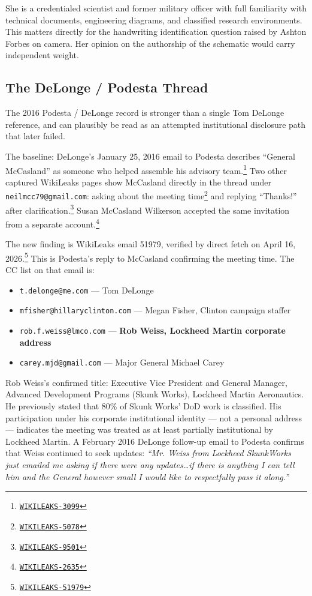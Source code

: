 \documentclass[11pt]{article}
\newcommand{\src}[2]{\href{#1}{\texttt{#2}}}
\begin{document}
She is a credentialed scientist and former military officer with full familiarity with technical documents, engineering diagrams, and classified research environments. This matters directly for the handwriting identification question raised by Ashton Forbes on camera. Her opinion on the authorship of the schematic would carry independent weight.

\subsection{The DeLonge / Podesta Thread}

The 2016 Podesta / DeLonge record is stronger than a single Tom DeLonge reference, and can plausibly be read as an attempted institutional disclosure path that later failed.

The baseline: DeLonge's January 25, 2016 email to Podesta describes ``General McCasland'' as someone who helped assemble his advisory team.\footnote{\src{https://wikileaks.org/podesta-emails/emailid/3099}{WIKILEAKS-3099}} Two other captured WikiLeaks pages show McCasland directly in the thread under \texttt{neilmcc79@gmail.com}: asking about the meeting time\footnote{\src{https://wikileaks.org/podesta-emails/emailid/5078}{WIKILEAKS-5078}} and replying ``Thanks!'' after clarification.\footnote{\src{https://wikileaks.org/podesta-emails/emailid/9501}{WIKILEAKS-9501}} Susan McCasland Wilkerson accepted the same invitation from a separate account.\footnote{\src{https://wikileaks.org/podesta-emails/emailid/2635}{WIKILEAKS-2635}}

The new finding is WikiLeaks email 51979, verified by direct fetch on April 16, 2026.\footnote{\src{https://wikileaks.org/podesta-emails/emailid/51979}{WIKILEAKS-51979}} This is Podesta's reply to McCasland confirming the meeting time. The CC list on that email is:

\begin{itemize}
  \item \texttt{t.delonge@me.com} — Tom DeLonge
  \item \texttt{mfisher@hillaryclinton.com} — Megan Fisher, Clinton campaign staffer
  \item \texttt{rob.f.weiss@lmco.com} — \textbf{Rob Weiss, Lockheed Martin corporate address}
  \item \texttt{carey.mjd@gmail.com} — Major General Michael Carey
\end{itemize}

Rob Weiss's confirmed title: Executive Vice President and General Manager, Advanced Development Programs (Skunk Works), Lockheed Martin Aeronautics. He previously stated that 80\% of Skunk Works' DoD work is classified. His participation under his corporate institutional identity — not a personal address — indicates the meeting was treated as at least partially institutional by Lockheed Martin. A February 2016 DeLonge follow-up email to Podesta confirms that Weiss continued to seek updates: \emph{``Mr. Weiss from Lockheed SkunkWorks just emailed me asking if there were any updates\ldots if there is anything I can tell him and the General however small I would like to respectfully pass it along.''}
\end{document}
